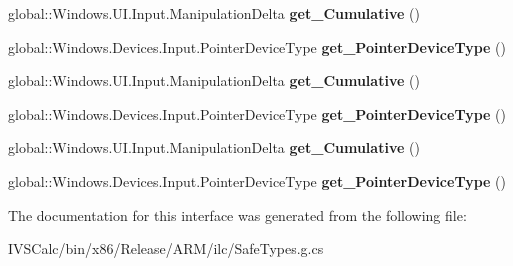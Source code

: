 \begin{DoxyCompactItemize}
\mbox{\label{interface_windows_1_1_u_i_1_1_xaml_1_1_input_1_1_i_manipulation_delta_routed_event_args_aac7701796d3762bf2392d05fad5d7bf4}} 
global\+::\+Windows.\+U\+I.\+Input.\+Manipulation\+Delta {\bfseries get\+\_\+\+Cumulative} ()
\item 
\mbox{\label{interface_windows_1_1_u_i_1_1_xaml_1_1_input_1_1_i_manipulation_delta_routed_event_args_a667503ef934770b5b3a879a6c0955271}} 
global\+::\+Windows.\+Devices.\+Input.\+Pointer\+Device\+Type {\bfseries get\+\_\+\+Pointer\+Device\+Type} ()
\item 
\mbox{\label{interface_windows_1_1_u_i_1_1_xaml_1_1_input_1_1_i_manipulation_delta_routed_event_args_aac7701796d3762bf2392d05fad5d7bf4}} 
global\+::\+Windows.\+U\+I.\+Input.\+Manipulation\+Delta {\bfseries get\+\_\+\+Cumulative} ()
\item 
\mbox{\label{interface_windows_1_1_u_i_1_1_xaml_1_1_input_1_1_i_manipulation_delta_routed_event_args_a667503ef934770b5b3a879a6c0955271}} 
global\+::\+Windows.\+Devices.\+Input.\+Pointer\+Device\+Type {\bfseries get\+\_\+\+Pointer\+Device\+Type} ()
\item 
\mbox{\label{interface_windows_1_1_u_i_1_1_xaml_1_1_input_1_1_i_manipulation_delta_routed_event_args_aac7701796d3762bf2392d05fad5d7bf4}} 
global\+::\+Windows.\+U\+I.\+Input.\+Manipulation\+Delta {\bfseries get\+\_\+\+Cumulative} ()
\item 
\mbox{\label{interface_windows_1_1_u_i_1_1_xaml_1_1_input_1_1_i_manipulation_delta_routed_event_args_a667503ef934770b5b3a879a6c0955271}} 
global\+::\+Windows.\+Devices.\+Input.\+Pointer\+Device\+Type {\bfseries get\+\_\+\+Pointer\+Device\+Type} ()
\end{DoxyCompactItemize}


The documentation for this interface was generated from the following file\+:\begin{DoxyCompactItemize}
\item 
I\+V\+S\+Calc/bin/x86/\+Release/\+A\+R\+M/ilc/Safe\+Types.\+g.\+cs\end{DoxyCompactItemize}
